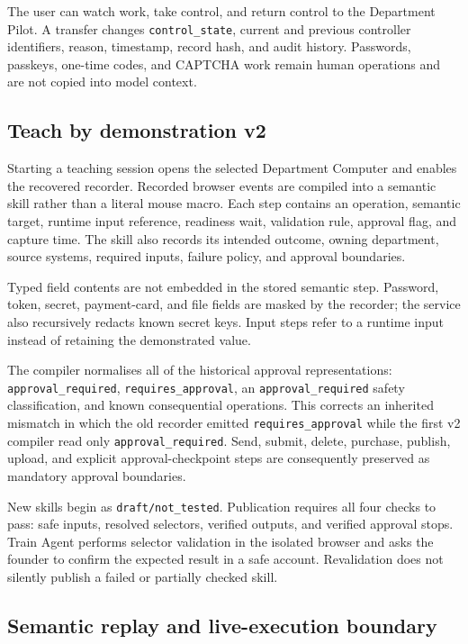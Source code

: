 The user can watch work, take control, and return control to the Department
Pilot.  A transfer changes \texttt{control\_state}, current and previous
controller identifiers, reason, timestamp, record hash, and audit history.
Passwords, passkeys, one-time codes, and CAPTCHA work remain human operations
and are not copied into model context.

\subsection{Teach by demonstration v2}

Starting a teaching session opens the selected Department Computer and enables
the recovered recorder.  Recorded browser events are compiled into a semantic
skill rather than a literal mouse macro.  Each step contains an operation,
semantic target, runtime input reference, readiness wait, validation rule,
approval flag, and capture time.  The skill also records its intended outcome,
owning department, source systems, required inputs, failure policy, and
approval boundaries.

Typed field contents are not embedded in the stored semantic step.  Password,
token, secret, payment-card, and file fields are masked by the recorder; the
service also recursively redacts known secret keys.  Input steps refer to a
runtime input instead of retaining the demonstrated value.

The compiler normalises all of the historical approval representations:
\texttt{approval\_required}, \texttt{requires\_approval}, an
\texttt{approval\_required} safety classification, and known consequential
operations.  This corrects an inherited mismatch in which the old recorder
emitted \texttt{requires\_approval} while the first v2 compiler read only
\texttt{approval\_required}.  Send, submit, delete, purchase, publish, upload,
and explicit approval-checkpoint steps are consequently preserved as mandatory
approval boundaries.

New skills begin as \texttt{draft/not\_tested}.  Publication requires all four
checks to pass: safe inputs, resolved selectors, verified outputs, and verified
approval stops.  Train Agent performs selector validation in the isolated
browser and asks the founder to confirm the expected result in a safe account.
Revalidation does not silently publish a failed or partially checked skill.

\subsection{Semantic replay and live-execution boundary}


